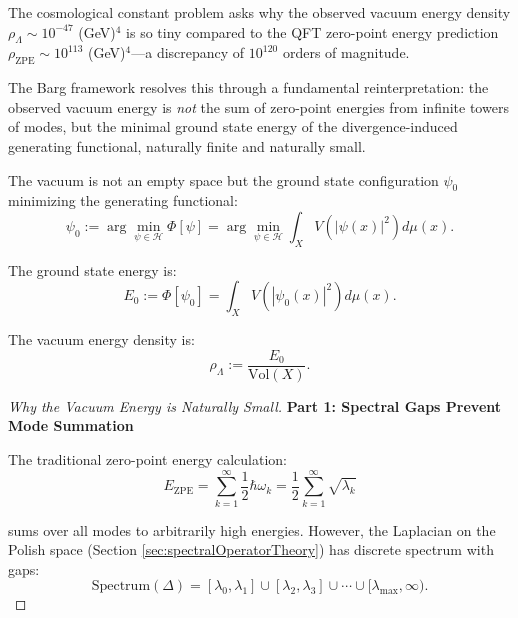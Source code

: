 \begin{theorem}
\label{thm:cosmologicalConstantResolution}

The cosmological constant problem asks why the observed vacuum energy density $\rho_\Lambda \sim 10^{-47}$ (GeV)$^4$ is so tiny compared to the QFT zero-point energy prediction $\rho_{\text{ZPE}} \sim 10^{113}$ (GeV)$^4$---a discrepancy of $10^{120}$ orders of magnitude.

The Barg framework resolves this through a fundamental reinterpretation: the observed vacuum energy is \emph{not} the sum of zero-point energies from infinite towers of modes, but the minimal ground state energy of the divergence-induced generating functional, naturally finite and naturally small.

\begin{definition}

The vacuum is not an empty space but the ground state configuration $\psi_0$ minimizing the generating functional:
\begin{equation}
\psi_0 := \arg\min_{\psi \in \mathcal{H}} \Phi[\psi] = \arg\min_{\psi \in \mathcal{H}} \int_X V(|\psi(x)|^2) d\mu(x).
\end{equation}

The ground state energy is:
\begin{equation}
E_0 := \Phi[\psi_0] = \int_X V(|\psi_0(x)|^2) d\mu(x).
\end{equation}

The vacuum energy density is:
\begin{equation}
\rho_\Lambda := \frac{E_0}{\text{Vol}(X)}.
\end{equation}

\end{definition}

\begin{proof}[Why the Vacuum Energy is Naturally Small]

\textbf{Part 1: Spectral Gaps Prevent Mode Summation}

The traditional zero-point energy calculation:
\begin{equation}
E_{\text{ZPE}} = \sum_{k=1}^\infty \frac{1}{2} \hbar \omega_k = \frac{1}{2} \sum_{k=1}^\infty \sqrt{\lambda_k}
\end{equation}

sums over all modes to arbitrarily high energies. However, the Laplacian on the Polish space (Section \ref{sec:spectralOperatorTheory}) has discrete spectrum with gaps:
\begin{equation}
\text{Spectrum}(\Delta) = [\lambda_0, \lambda_1] \cup [\lambda_2, \lambda_3] \cup \cdots \cup [\lambda_{\max}, \infty).
\end{equation}


\end{proof}
\end{theorem}
